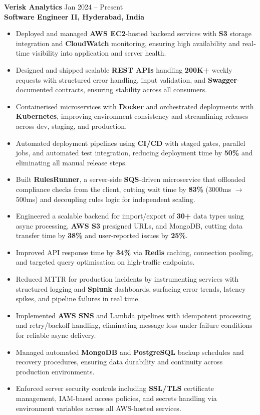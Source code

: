 \documentclass[a4paper,10pt]{article}
\begin{document}
\textbf{Verisk Analytics} \hfill Jan 2024 -- Present \\
\textbf{Software Engineer II, Hyderabad, India}
\begin{itemize}[leftmargin=*]
    \item Deployed and managed \textbf{AWS EC2}-hosted backend services with \textbf{S3} storage integration and \textbf{CloudWatch} monitoring, ensuring high availability and real-time visibility into application and server health.
    \item Designed and shipped scalable \textbf{REST APIs} handling \textbf{200K+} weekly requests with structured error handling, input validation, and \textbf{Swagger}-documented contracts, ensuring stability across all consumers.
    \item Containerised microservices with \textbf{Docker} and orchestrated deployments with \textbf{Kubernetes}, improving environment consistency and streamlining releases across dev, staging, and production.
    \item Automated deployment pipelines using \textbf{CI/CD} with staged gates, parallel jobs, and automated test integration, reducing deployment time by \textbf{50\%} and eliminating all manual release steps.
    \item Built \textbf{RulesRunner}, a server-side \textbf{SQS}-driven microservice that offloaded compliance checks from the client, cutting wait time by \textbf{83\%} (3000ms $\rightarrow$ 500ms) and decoupling rules logic for independent scaling.
    \item Engineered a scalable backend for import/export of \textbf{30+} data types using async processing, \textbf{AWS S3} presigned URLs, and MongoDB, cutting data transfer time by \textbf{38\%} and user-reported issues by \textbf{25\%}.
    \item Improved API response time by \textbf{34\%} via \textbf{Redis} caching, connection pooling, and targeted query optimisation on high-traffic endpoints.
    \item Reduced MTTR for production incidents by instrumenting services with structured logging and \textbf{Splunk} dashboards, surfacing error trends, latency spikes, and pipeline failures in real time.
    \item Implemented \textbf{AWS SNS} and Lambda pipelines with idempotent processing and retry/backoff handling, eliminating message loss under failure conditions for reliable async delivery.
    \item Managed automated \textbf{MongoDB} and \textbf{PostgreSQL} backup schedules and recovery procedures, ensuring data durability and continuity across production environments.
    \item Enforced server security controls including \textbf{SSL/TLS} certificate management, IAM-based access policies, and secrets handling via environment variables across all AWS-hosted services.
\end{itemize}
\end{document}
